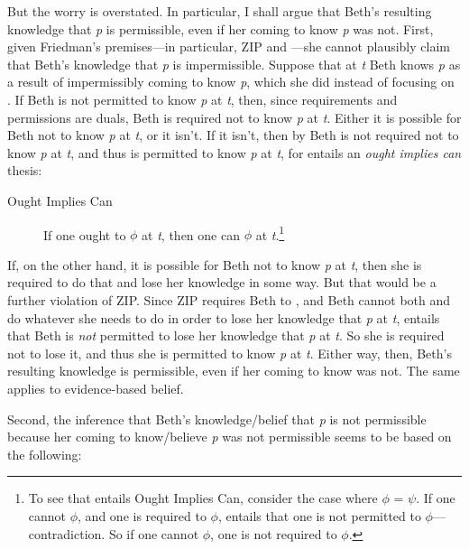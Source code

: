 \documentclass[12pt]{article}
\begin{document}
But the worry is overstated. In particular, I shall argue that Beth's resulting knowledge that \textit{p} is permissible, even if her coming to know \textit{p} was not. First, given Friedman's premises---in particular, ZIP and \opic{}---she cannot plausibly claim that Beth's knowledge that \textit{p} is impermissible. Suppose that at \textit{t} Beth knows \textit{p} as a result of impermissibly coming to know \textit{p}, which she did instead of focusing on . If Beth is not permitted to know \textit{p} at \textit{t}, then, since requirements and permissions are duals, Beth is required not to know \textit{p} at \textit{t}. Either it is possible for Beth not to know \textit{p} at \textit{t}, or it isn't. If it isn't, then by \opic{} Beth is not required not to know \textit{p} at \textit{t}, and thus is permitted to know \textit{p} at \textit{t}, for \opic{} entails an \textit{ought implies can} thesis:

\newcommand{\oc}{Ought Implies Can}
\begin{description}
    \item[\oc{}] If one ought to $\phi$ at \textit{t}, then one can $\phi$ at \textit{t}.\footnote{To see that \opic{} entails \oc{}, consider the case where $\phi$ = $\psi$. If one cannot $\phi$, and one is required to $\phi$, \opic{} entails that one is not permitted to $\phi$---contradiction. So if one cannot $\phi$, one is not required to $\phi$.}
\end{description}
%
If, on the other hand, it is possible for Beth not to know \textit{p} at \textit{t}, then she is required to do that and lose her knowledge in some way. But that would be a further violation of ZIP. Since ZIP requires Beth to \foc{}, and Beth cannot both \foc{} and do whatever she needs to do in order to lose her knowledge that \textit{p} at \textit{t}, \opic{} entails that Beth is \textit{not} permitted to lose her knowledge that \textit{p} at \textit{t}. So she is required not to lose it, and thus she is permitted to know \textit{p} at \textit{t}. Either way, then, Beth's resulting knowledge is permissible, even if her coming to know was not. The same applies to evidence-based belief.

Second, the inference that Beth's knowledge/belief that \textit{p} is not permissible because her coming to know/believe \textit{p} was not permissible seems to be based on the following:
\end{document}
